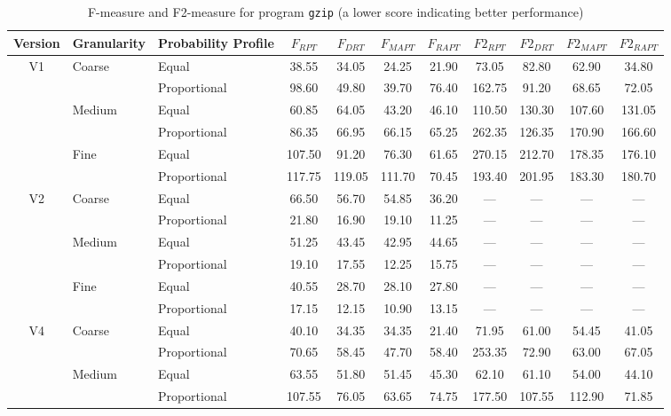 \documentclass[10pt,journal,compsoc]{IEEEtran}
\begin{document}
\begin{table*}
\caption{F-measure and F2-measure for program \texttt{gzip} (a lower score indicating better performance)}
\label{tab:Fgzip}
\centering
\begin{tabular}{|c|l|l|c|c|c|c|c|c|c|c|} \hline
Version	& Granularity	& Probability Profile	& $F_{RPT}$	& $F_{DRT}$	& $F_{MAPT}$	& $F_{RAPT}$	& $F2_{RPT}$	& $F2_{DRT}$	& $F2_{MAPT}$	 & $F2_{RAPT}$	\\ \hline
V1	& Coarse	& Equal	& 38.55	& 34.05	& 24.25	& 21.90	& 73.05	& 82.80	& 62.90	& 34.80	\\ \cline{3-11}
	& 	& Proportional	& 98.60	& 49.80	& 39.70	& 76.40	& 162.75	& 91.20	& 68.65	& 72.05	\\ \cline{2-11}
	& Medium	& Equal	& 60.85	& 64.05	& 43.20	& 46.10	& 110.50	& 130.30	& 107.60	& 131.05	\\ \cline{3-11}
	& 	& Proportional	& 86.35	& 66.95	& 66.15	& 65.25	& 262.35	& 126.35	& 170.90	& 166.60	\\ \cline{2-11}
	& Fine	& Equal	& 107.50	& 91.20	& 76.30	& 61.65	& 270.15	& 212.70	& 178.35	& 176.10	\\ \cline{3-11}
	& 	& Proportional	& 117.75	& 119.05	& 111.70	& 70.45	& 193.40	& 201.95	& 183.30	& 180.70	\\ \hline
V2	& Coarse	& Equal	& 66.50	& 56.70	& 54.85	& 36.20	& ---	& ---	& ---	& ---	\\ \cline{3-11}
	& 	& Proportional	& 21.80	& 16.90	& 19.10	& 11.25	& ---	& ---	& ---	& ---	\\ \cline{2-11}
	& Medium	& Equal	& 51.25	& 43.45	& 42.95	& 44.65	& ---	& ---	& ---	& ---	\\ \cline{3-11}
	& 	& Proportional	& 19.10	& 17.55	& 12.25	& 15.75	& ---	& ---	& ---	& ---	\\ \cline{2-11}
	& Fine	& Equal	& 40.55	& 28.70	& 28.10	& 27.80	& ---	& ---	& ---	& ---	\\ \cline{3-11}
	& 	& Proportional	& 17.15	& 12.15	& 10.90	& 13.15	& ---	& ---	& ---	& ---	\\ \hline
V4	& Coarse	& Equal	& 40.10	& 34.35	& 34.35	& 21.40	& 71.95	& 61.00	& 54.45	& 41.05	\\ \cline{3-11}
	& 	& Proportional	& 70.65	& 58.45	& 47.70	& 58.40	& 253.35	& 72.90	& 63.00	& 67.05	\\ \cline{2-11}
	& Medium	& Equal	& 63.55	& 51.80	& 51.45	& 45.30	& 62.10	& 61.10	& 54.00	& 44.10	\\ \cline{3-11}
	& 	& Proportional	& 107.55	& 76.05	& 63.65	& 74.75	& 177.50	& 107.55	& 112.90	& 71.85	\\ \cline{2-11}

\end{tabular}
\end{table*}
\end{document}
